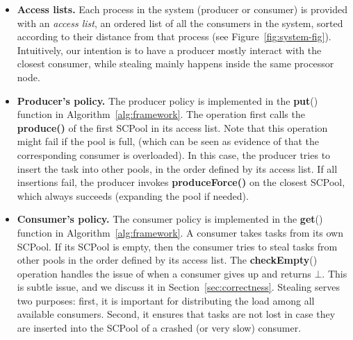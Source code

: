 \begin{itemize}
	\item {\bf Access lists.} Each process in the system (producer or consumer) is provided with an \emph{access list}, an ordered list of all the consumers in the system, sorted according to their distance from that process (see Figure~\ref{fig:system-fig}). Intuitively, our intention is to have a producer mostly interact with the closest consumer, while stealing mainly happens inside the same processor node. 
	\item {\bf Producer's policy.} The producer policy is implemented in the {\bf put}() function in Algorithm~\ref{alg:framework}. The operation first calls the {\bf produce()} of the first SCPool in its access list. Note that this operation might fail if the pool is full, (which can be seen as evidence of that the corresponding consumer is overloaded).  In this case, the producer tries to insert the task into other pools, in the order defined by its access list. If all insertions fail, the producer invokes {\bf produceForce()} on the closest SCPool, which always succeeds (expanding the pool if needed). 
	\item {\bf Consumer's policy.} The consumer policy is implemented in the {\bf get}() function in Algorithm~\ref{alg:framework}. A consumer takes tasks from its own SCPool. If its SCPool is empty, then the consumer tries to steal tasks from other pools in the order defined by its access list. The {\bf checkEmpty}() operation handles the issue of when a consumer gives up and returns $\bot$. This is subtle issue, and we discuss it in Section~\ref{sec:correctness}. Stealing serves two purposes: first, it is important for distributing the load among all available consumers. Second, it ensures that tasks are not lost in case they are inserted into  the SCPool of a crashed (or very slow) consumer.
\end{itemize}
%
%
%
%
%
%
%
%
%
